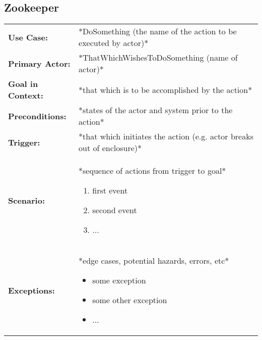 \documentclass[12pt]{article}
\begin{document}
    
    
    \subsection{Zookeeper}
    \begin{table}[H]
    \begin{tabular}{lp{9.9cm}}
        \hline
        \textbf{Use Case:}                     & *DoSomething (the name of the action to be executed by actor)* \\

        \textbf{Primary Actor:}                & *ThatWhichWishesToDoSomething (name of actor)*\\

        \textbf{Goal in Context:}              & *that which is to be accomplished by the action* \\

        \textbf{Preconditions:}                & *states of the actor and system prior to the action* \\

        \textbf{Trigger:}                      & *that which initiates the action (e.g. actor breaks out of enclosure)*\\

        \textbf{Scenario:}                     & *sequence of actions from trigger to goal*
                                                 \begin{enumerate}
                                                     \item first event
                                                     \item second event
                                                     \item ...
                                                 \end{enumerate} \\

        \textbf{Exceptions:}                   & *edge cases, potential hazards, errors, etc*
                                                 \begin{itemize}
                                                     \item[] some exception
                                                     \item[] some other exception
                                                     \item[] ...
                                                 \end{itemize}\\


\end{tabular}
\end{table}
\end{document}

